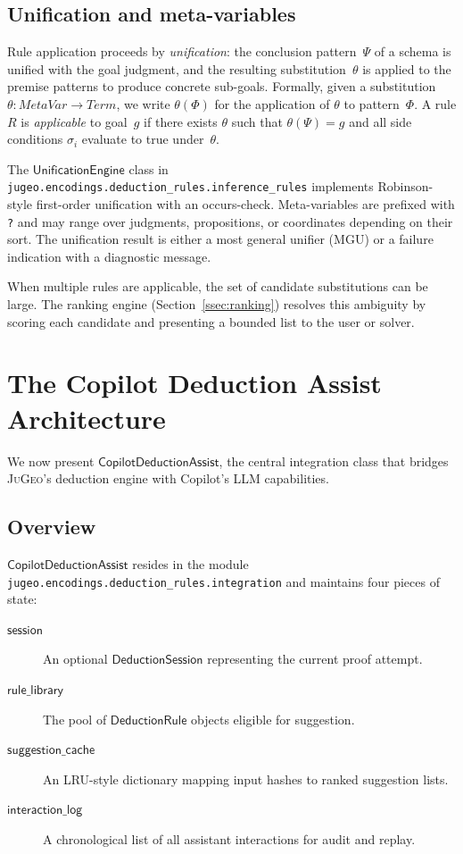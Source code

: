 \documentclass[11pt]{article}
\newcommand{\CDA}{\ensuremath{\mathsf{CopilotDeductionAssist}}}
\newcommand{\DR}{\ensuremath{\mathsf{DeductionRule}}}
\newcommand{\JG}{\textsc{JuGeo}}
\newcommand{\LLM}{\textsc{LLM}}
\begin{document}
\subsection{Unification and meta-variables}\label{ssec:unification}

Rule application proceeds by \emph{unification}: the conclusion
pattern~$\Psi$ of a schema is unified with the goal judgment, and
the resulting substitution~$\theta$ is applied to the premise
patterns to produce concrete sub-goals.  Formally, given a
substitution $\theta : \mathit{MetaVar} \to \mathit{Term}$, we
write $\theta(\Phi)$ for the application of $\theta$ to
pattern~$\Phi$.  A rule $R$ is \emph{applicable} to goal~$g$ if
there exists $\theta$ such that $\theta(\Psi) = g$ and all side
conditions $\sigma_i$ evaluate to true under~$\theta$.

The $\mathsf{UnificationEngine}$ class in
\texttt{jugeo.encodings.deduction\_rules.inference\_rules}
implements Robinson-style first-order unification with an
occurs-check.  Meta-variables are prefixed with \texttt{?} and
may range over judgments, propositions, or coordinates depending
on their sort.  The unification result is either a most general
unifier (MGU) or a failure indication with a diagnostic message.

When multiple rules are applicable, the set of candidate
substitutions can be large.  The ranking engine
(Section~\ref{ssec:ranking}) resolves this ambiguity by scoring
each candidate and presenting a bounded list to the user or
solver.


\section{The Copilot Deduction Assist Architecture}
\label{sec:architecture}

We now present $\CDA$, the central integration class that bridges
\JG{}'s deduction engine with Copilot's \LLM{} capabilities.

\subsection{Overview}\label{ssec:arch-overview}

$\CDA$ resides in the module
\texttt{jugeo.encodings.deduction\_rules.integration} and
maintains four pieces of state:
\begin{description}
  \item[$\mathsf{session}$] An optional $\mathsf{DeductionSession}$
    representing the current proof attempt.
  \item[$\mathsf{rule\_library}$] The pool of $\DR$ objects
    eligible for suggestion.
  \item[$\mathsf{suggestion\_cache}$] An LRU-style dictionary
    mapping input hashes to ranked suggestion lists.
  \item[$\mathsf{interaction\_log}$] A chronological list of all
    assistant interactions for audit and replay.
\end{description}
\end{document}

